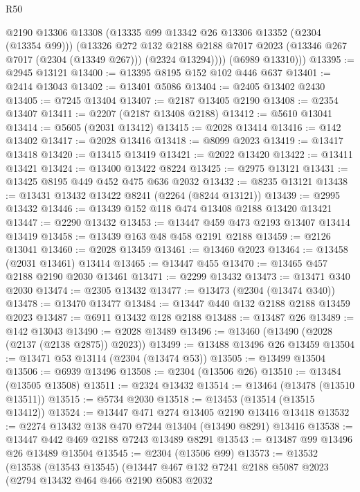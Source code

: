 \begin{lexlean}{R50}
\begin{coremodule}
            @2190
            @13306
            @13308
            (@13335 @99 @13342 @26 @13306 @13352 (@2304 (@13354 @99)))
            (@13326
              @272
              @132
              @2188
              @2188
              @7017
              @2023
              (@13346 @267 @7017 (@2304 (@13349 @267)))
              (@2324 @13294))))
        (@6989 @13310)))
@13395 := @2945 @13121
@13400 := @13395 @8195 @152 @102 @446 @637
@13401 := @2414 @13043
@13402 := @13401 @5086
@13404 := @2405 @13402 @2430
@13405 := @7245 @13404
@13407 := @2187 @13405 @2190
@13408 := @2354 @13407
@13411 := @2207 (@2187 @13408 @2188)
@13412 := @5610 @13041
@13414 := @5605 (@2031 @13412)
@13415 := @2028 @13414
@13416 := @142 @13402
@13417 := @2028 @13416
@13418 := @8099 @2023
@13419 := @13417 @13418
@13420 := @13415 @13419
@13421 := @2022 @13420
@13422 := @13411 @13421
@13424 := @13400 @13422 @8224
@13425 := @2975 @13121
@13431 := @13425 @8195 @449 @452 @475 @636 @2032
@13432 := @8235 @13121
@13438 := @13431 @13432 @13422 @8241 (@2264 (@8244 @13121))
@13439 := @2995 @13432
@13446 := @13439 @152 @118 @474 @13408 @2188 @13420 @13421
@13447 := @2290 @13432
@13453 := @13447 @459 @473 @2193 @13407 @13414 @13419
@13458 := @13439 @163 @48 @458 @2191 @2188
@13459 := @2126 @13041
@13460 := @2028 @13459
@13461 := @13460 @2023
@13464 := @13458 (@2031 @13461) @13414
@13465 := @13447 @455
@13470 := @13465 @457 @2188 @2190 @2030 @13461
@13471 := @2299 @13432
@13473 := @13471 @340 @2030
@13474 := @2305 @13432
@13477 := @13473 (@2304 (@13474 @340))
@13478 := @13470 @13477
@13484 := @13447 @440 @132 @2188 @2188 @13459 @2023
@13487 := @6911 @13432 @128 @2188
@13488 := @13487 @26
@13489 := @142 @13043
@13490 := @2028 @13489
@13496 := @13460 (@13490 (@2028 (@2137 (@2138 @2875)) @2023))
@13499 := @13488 @13496 @26 @13459
@13504 := @13471 @53 @13114 (@2304 (@13474 @53))
@13505 := @13499 @13504
@13506 := @6939 @13496
@13508 := @2304 (@13506 @26)
@13510 := @13484 (@13505 @13508)
@13511 := @2324 @13432
@13514 := @13464 (@13478 (@13510 @13511))
@13515 := @5734 @2030
@13518 := @13453 (@13514 (@13515 @13412))
@13524 := @13447 @471 @274 @13405 @2190 @13416 @13418
@13532 := @2274 @13432 @138 @470 @7244 @13404 (@13490 @8291) @13416
@13538 := @13447 @442 @469 @2188 @7243 @13489 @8291
@13543 := @13487 @99 @13496 @26 @13489 @13504
@13545 := @2304 (@13506 @99)
@13573 := @13532
    (@13538
      (@13543 @13545)
      (@13447
        @467
        @132
        @7241
        @2188
        @5087
        @2023
        (@2794
          @13432
          @464
          @466
          @2190
          @5083
          @2032

\end{coremodule}
\end{lexlean}
